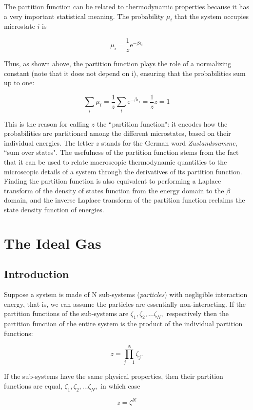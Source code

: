 \documentclass{tufte-handout}
\begin{document}
The partition function can be related to thermodynamic properties because it has a very important
 statistical meaning. The probability \(\mu_i\) that the system occupies microstate \(i\) is

    \[\mu_i = \frac{1}{z} \mathrm{e}^{- \beta \epsilon_i}\]

Thus, as shown above, the partition function plays the role of a normalizing constant 
(note that it does not depend on i), ensuring that the probabilities sum up to one:

    \[\sum_i \mu_i = \frac{1}{z} \sum_i \mathrm{e}^{- \beta \epsilon_i} = \frac{1}{z} z = 1\]

This is the reason for calling \(z\) the ``partition function": it encodes how the probabilities 
are partitioned among the different microstates, based on their individual energies.
The letter \(z\) stands for the German word \textit{Zustandssumme}, ``sum over states". The usefulness
of the partition function stems from the fact that it can be used to relate macroscopic 
thermodynamic quantities to the microscopic details of a system through the derivatives 
of its partition function. Finding the partition function is also equivalent to performing a 
Laplace transform of the density of states function from the energy domain to the \(\beta\) domain, 
and the inverse Laplace transform of the partition function reclaims the state density function 
of energies.

\section{The Ideal Gas}

\subsection{Introduction}
Suppose a system is made of N sub-systems (\textit{particles}) with negligible interaction energy, that is, 
we can assume the particles are essentially non-interacting. If the partition functions of the 
sub-systems are \(\zeta_1, \zeta_2, \ldots \zeta _N,\) respectively then the partition function 
of the entire system is the product 
of the individual partition functions:

    \[z =\prod_{j=1}^{N} \zeta_j.\]

If the sub-systems have the same physical properties, then their partition functions
 are equal, \(\zeta_1, \zeta_2, \ldots \zeta _N,\) in which case

    \[z = \zeta^N\]
\end{document}
